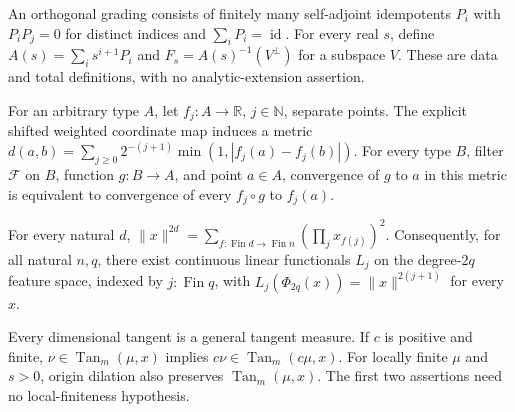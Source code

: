 \begin{definition}
\label{def:orthogonal-grading}
\uses{}

An orthogonal grading consists of finitely many self-adjoint idempotents $P_i$ with $P_iP_j=0$ for distinct indices and $\sum_iP_i=\operatorname{id}$. For every real $s$, define $A(s)=\sum_i s^{i+1}P_i$ and $F_s=A(s)^{-1}(V^\perp)$ for a subspace $V$. These are data and total definitions, with no analytic-extension assertion.
\end{definition}

\begin{lemma}
\label{lem:countable-coordinate-metric}

For an arbitrary type $A$, let $f_j:A\to\mathbb R$, $j\in\mathbb N$, separate points. The explicit shifted weighted coordinate map induces a metric $d(a,b)=\sum_{j\geq0}2^{-(j+1)}\min(1,|f_j(a)-f_j(b)|)$. For every type $B$, filter $\mathcal F$ on $B$, function $g:B\to A$, and point $a\in A$, convergence of $g$ to $a$ in this metric is equivalent to convergence of every $f_j\circ g$ to $f_j(a)$.
\end{lemma}

\begin{lemma}
\label{lem:feature-norm-functionals}

For every natural $d$, $\|x\|^{2d}=\sum_{f:\operatorname{Fin}d\to\operatorname{Fin}n}(\prod_jx_{f(j)})^2$. Consequently, for all natural $n,q$, there exist continuous linear functionals $L_j$ on the degree-$2q$ feature space, indexed by $j:\operatorname{Fin}q$, with $L_j(\Phi_{2q}(x))=\|x\|^{2(j+1)}$ for every $x$.
\end{lemma}

\begin{lemma}
\label{lem:dimensional-tangent-operations}

Every dimensional tangent is a general tangent measure. If $c$ is positive and finite, $\nu\in\operatorname{Tan}_m(\mu,x)$ implies $c\nu\in\operatorname{Tan}_m(c\mu,x)$. For locally finite $\mu$ and $s>0$, origin dilation also preserves $\operatorname{Tan}_m(\mu,x)$. The first two assertions need no local-finiteness hypothesis.
\end{lemma}

